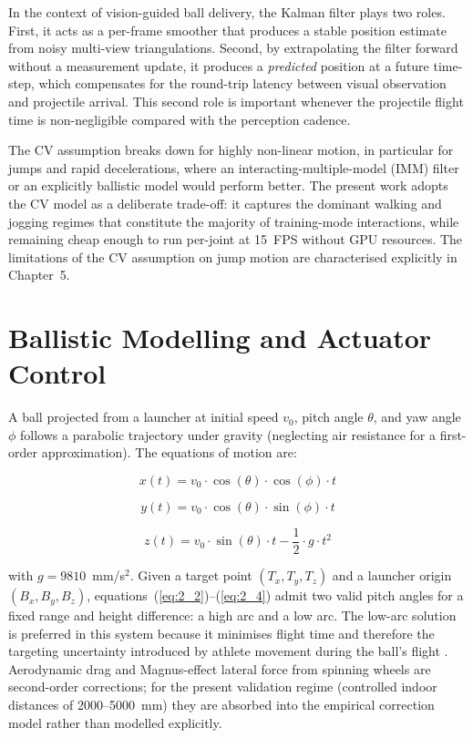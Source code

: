 In the context of vision-guided ball delivery, the Kalman filter plays two roles. First, it acts as a per-frame smoother that produces a stable position estimate from noisy multi-view triangulations. Second, by extrapolating the filter forward without a measurement update, it produces a \textit{predicted} position at a future time-step, which compensates for the round-trip latency between visual observation and projectile arrival. This second role is important whenever the projectile flight time is non-negligible compared with the perception cadence.

The CV assumption breaks down for highly non-linear motion, in particular for jumps and rapid decelerations, where an interacting-multiple-model (IMM) filter or an explicitly ballistic model would perform better. The present work adopts the CV model as a deliberate trade-off: it captures the dominant walking and jogging regimes that constitute the majority of training-mode interactions, while remaining cheap enough to run per-joint at 15~FPS without GPU resources. The limitations of the CV assumption on jump motion are characterised explicitly in Chapter~5.

\section{Ballistic Modelling and Actuator Control}

A ball projected from a launcher at initial speed $v_0$, pitch angle $\theta$, and yaw angle $\phi$ follows a parabolic trajectory under gravity (neglecting air resistance for a first-order approximation). The equations of motion are:

\begin{equation}
x(t) = v_0 \cdot \cos(\theta) \cdot \cos(\phi) \cdot t \label{eq:2_2}
\end{equation}

\begin{equation}
y(t) = v_0 \cdot \cos(\theta) \cdot \sin(\phi) \cdot t \label{eq:2_3}
\end{equation}

\begin{equation}
z(t) = v_0 \cdot \sin(\theta) \cdot t - \frac{1}{2} \cdot g \cdot t^2 \label{eq:2_4}
\end{equation}

with $g = 9810$~mm/s$^2$. Given a target point $(T_x, T_y, T_z)$ and a launcher origin $(B_x, B_y, B_z)$, equations~(\ref{eq:2_2})--(\ref{eq:2_4}) admit two valid pitch angles for a fixed range and height difference: a high arc and a low arc. The low-arc solution is preferred in this system because it minimises flight time and therefore the targeting uncertainty introduced by athlete movement during the ball's flight \cite{ref19}. Aerodynamic drag and Magnus-effect lateral force from spinning wheels are second-order corrections; for the present validation regime (controlled indoor distances of 2000--5000~mm) they are absorbed into the empirical correction model rather than modelled explicitly.

